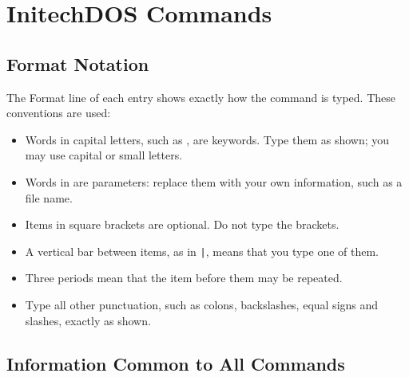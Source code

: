 \chapter{InitechDOS Commands}

\section{Format Notation}
The Format line of each entry shows exactly how the command is typed.  These
conventions are used:
\begin{itemize}
\item Words in capital letters, such as , are keywords.  Type them
  as shown; you may use capital or small letters.
\item Words in  are parameters: replace them with your own
  information, such as a file name.
\item Items in square brackets  are optional.  Do not
  type the brackets.
\item A vertical bar between items, as in \texttt{|}, means
  that you type one of them.
\item Three periods \rep{} mean that the item before them may be repeated.
\item Type all other punctuation, such as colons, backslashes, equal signs
  and slashes, exactly as shown.
\end{itemize}

\section{Information Common to All Commands}

